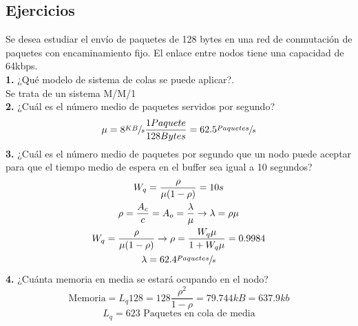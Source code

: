 \subsection{Ejercicios}
\begin{exercise}[1]
Se desea estudiar el envío de paquetes de 128 bytes en una red de conmutación de paquetes con encaminamiento fijo. El enlace entre nodos tiene una capacidad de 64\gls{kbps}.\\
\textbf{1.} ¿Qué modelo de sistema de colas se puede aplicar?.\\
Se trata de un sistema M/M/1\\
\textbf{2.} ¿Cuál es el número medio de paquetes servidos por segundo?\\
\[\mu=8\sfrac{KB}{s}\frac{1Paquete}{128Bytes}=62.5\sfrac{Paquetes}{s}\]
\textbf{3.} ¿Cuál es el número medio de paquetes por segundo que un nodo puede aceptar para que el tiempo medio de espera en el buffer sea igual a 10 segundos?\\
\begin{gather*}
W_q=\frac{\rho}{\mu(1-\rho)}=10s\\
\rho=\frac{A_c}{c}=A_o=\frac{\lambda}{\mu}\to \lambda=\rho \mu\\
W_q=\frac{\rho}{\mu(1-\rho)}\to\rho=\frac{W_q \mu}{1+W_q\mu}=0.9984\\
\lambda=62.4\sfrac{Paquetes}{s}
\end{gather*}
\textbf{4.} ¿Cuánta memoria en media se estará ocupando en el nodo?\\
\[\text{Memoria}=L_q128=128\frac{\rho^2}{1-\rho}=79.744kB=637.9kb\]
\[L_q=623 \text{ Paquetes en cola de media}\]
\end{exercise}
